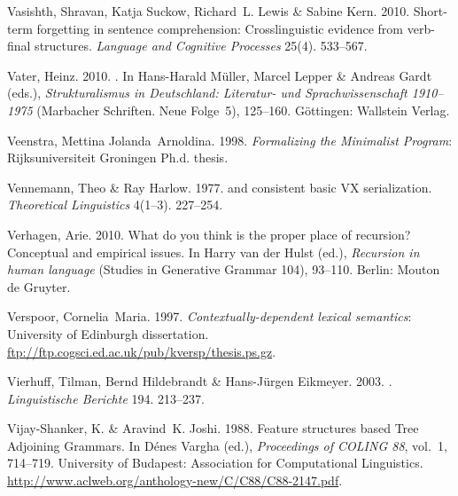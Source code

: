 \begin{thebibliography}{1420}
Vasishth, Shravan, Katja Suckow, Richard~L. Lewis \& Sabine Kern. 2010.
\newblock Short-term forgetting in sentence comprehension: {Crosslinguistic}
  evidence from verb-final structures.
\newblock \emph{Language and Cognitive Processes} 25(4). 533--567.

Vater, Heinz. 2010.
.
\newblock In Hans-Harald M{\"u}ller, Marcel Lepper \& Andreas Gardt (eds.),
  \emph{{Strukturalismus in Deutschland: Literatur- und Sprachwissenschaft
  1910--1975}} (Marbacher Schriften. Neue Folge~5), 125--160. G{\"o}ttingen:
  Wallstein Verlag.

Veenstra, Mettina Jolanda~Arnoldina. 1998.
\newblock \emph{Formalizing the {Minimalist Program}}: Rijksuniversiteit
  Groningen Ph.d. thesis.

Vennemann, Theo \& Ray Harlow. 1977.
 and consistent basic {VX} serialization.
\newblock \emph{Theoretical Linguistics} 4(1--3). 227--254.

Verhagen, Arie. 2010.
\newblock What do you think is the proper place of recursion? {Conceptual} and
  empirical issues.
\newblock In Harry {van der Hulst} (ed.), \emph{Recursion in human language}
  (Studies in Generative Grammar 104), 93--110. Berlin: Mouton de Gruyter.

Verspoor, Cornelia~Maria. 1997.
\newblock \emph{Contextually-dependent lexical semantics}: University of
  Edinburgh dissertation.
\newblock \urlprefix\url{ftp://ftp.cogsci.ed.ac.uk/pub/kversp/thesis.ps.gz}.

Vierhuff, Tilman, Bernd Hildebrandt \& Hans-J{\"u}rgen Eikmeyer. 2003.
.
\newblock \emph{Linguistische Berichte} 194. 213--237.

Vijay-Shanker, K. \& Aravind~K. Joshi. 1988.
\newblock Feature structures based {Tree Adjoining Grammars}.
\newblock In D{\'e}nes Vargha (ed.), \emph{Proceedings of {COLING} 88}, vol.~1,
  714--719. University of Budapest: Association for Computational Linguistics.
\newblock
  \urlprefix\url{http://www.aclweb.org/anthology-new/C/C88/C88-2147.pdf}.


\end{thebibliography}
